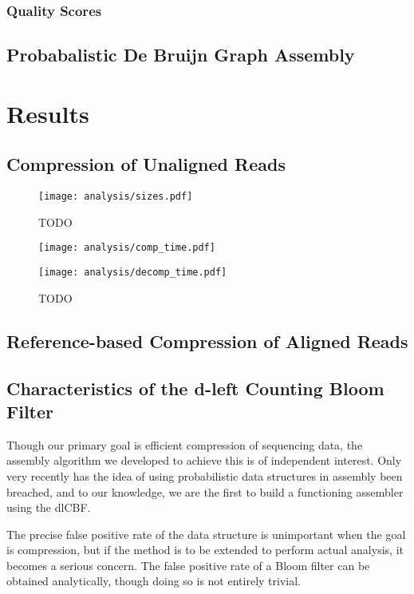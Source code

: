 \documentclass[twocolumn]{article}
\begin{document}
\subsubsection{Quality Scores}


\subsection{Probabalistic De Bruijn Graph Assembly}



\section{Results}


\subsection{Compression of Unaligned Reads}

\begin{figure*}
\centerline{\texttt{[image: analysis/sizes.pdf]}}
\caption{TODO}
\label{fig:sizes}
\end{figure*}

\begin{figure*}
\centerline{\texttt{[image: analysis/comp\_time.pdf]}}
\centerline{\texttt{[image: analysis/decomp\_time.pdf]}}
\caption{TODO}
\label{fig:comp_decomp_time}
\end{figure*}

\subsection{Reference-based Compression of Aligned Reads}

\subsection{Characteristics of the d-left Counting Bloom Filter}

Though our primary goal is efficient compression of sequencing data, the
assembly algorithm we developed to achieve this is of independent interest.
Only very recently has the idea of using probabilistic data structures in
assembly been breached, and to our knowledge, we are the first to build
a functioning assembler using the dlCBF.

The precise false positive rate of the data structure is unimportant when the
goal is compression, but if the method is to be extended to perform actual
analysis, it becomes a serious concern. The false positive rate of a Bloom
filter can be obtained analytically, though doing so is not entirely trivial.
\end{document}
